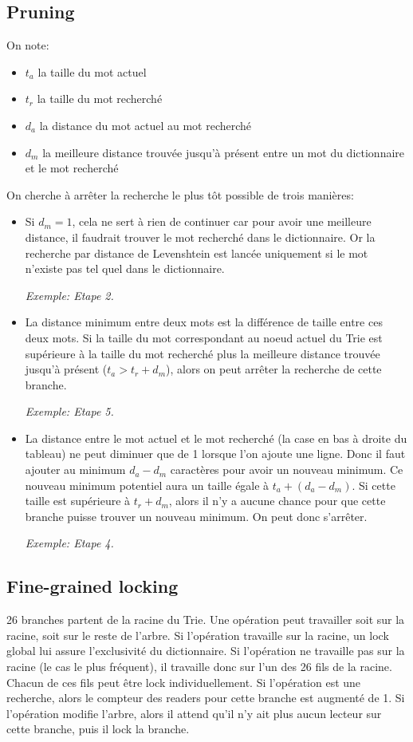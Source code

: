 \documentclass{article}
\begin{document}
\subsection{Pruning}
On note:
\begin{itemize}
\item $t_a$ la taille du mot actuel
\item $t_r$ la taille du mot recherché
\item $d_a$ la distance du mot actuel au mot recherché
\item $d_m$ la meilleure distance trouvée jusqu'à présent entre un mot du dictionnaire et le mot recherché
\end{itemize}
On cherche à arrêter la recherche le plus tôt possible de trois manières:
\begin{itemize}
\item Si $d_m = 1$, cela ne sert à rien de continuer car pour avoir une meilleure distance, il faudrait trouver le mot recherché dans le dictionnaire. Or la recherche par distance de Levenshtein est lancée uniquement si le mot n'existe pas tel quel dans le dictionnaire.

\textit{Exemple: Etape 2.}

\item La distance minimum entre deux mots est la différence de taille
  entre ces deux mots.
Si la taille du mot correspondant au noeud actuel du Trie est supérieure
à la taille du mot recherché plus la meilleure distance trouvée jusqu'à
présent ($t_a > t_r + d_m$), alors on peut arrêter la recherche de cette branche.

\textit{Exemple: Etape 5.}

\item La distance entre le mot actuel et le mot recherché (la case en
  bas à droite du tableau) ne peut diminuer que de 1 lorsque l'on ajoute
  une ligne.
Donc il faut ajouter au minimum $d_a - d_m$ caractères pour avoir un nouveau minimum.
Ce nouveau minimum potentiel aura un taille égale à $t_a + (d_a - d_m)$.
Si cette taille est supérieure à $t_r + d_m$,
alors il n'y a aucune chance pour que cette branche puisse trouver un
nouveau minimum.
On peut donc s'arrêter.

\textit{Exemple: Etape 4.}
\end{itemize}

\subsection{Fine-grained locking}
26 branches partent de la racine du Trie.
Une opération peut travailler soit sur la racine, soit sur le reste de
l'arbre.
Si l'opération travaille sur la racine, un lock global lui assure
l'exclusivité du dictionnaire.
Si l'opération ne travaille pas sur la racine (le cas le plus fréquent),
il travaille donc sur l'un des 26 fils de la racine.
Chacun de ces fils peut être lock individuellement.
Si l'opération est une recherche, alors le compteur des readers pour cette
branche est augmenté de 1.
Si l'opération modifie l'arbre, alors il attend qu'il n'y ait plus aucun
lecteur sur cette branche, puis il lock la branche.
\end{document}
